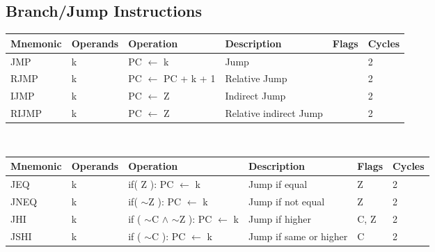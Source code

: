 \begin{footnotesize}
\subsection{Branch/Jump Instructions}
\begin{tabular}{|p{14.5mm}|p{14mm}|p{47mm}|p{46.5mm}|p{14mm}|p{10mm}|}
    \rowcolor{gray!50}
    Mnemonic & Operands  & Operation                                                              & Description & Flags & Cycles \\ \hline
    JMP      & k         & PC $\leftarrow$ k                                                      & Jump                                      &                & 2      \\
    RJMP     & k         & PC $\leftarrow$ PC + k + 1                                             & Relative Jump                             &                & 2      \\
    IJMP     & k         & PC $\leftarrow$ Z                                                      & Indirect Jump                             &                & 2      \\
    RIJMP    & k         & PC $\leftarrow$ Z                                                      & Relative indirect Jump                    &                & 2      \\
    \hline
\end{tabular}
\newline\\
\begin{tabular}{|p{14.5mm}|p{14mm}|p{47mm}|p{46.5mm}|p{14mm}|p{10mm}|}
    \rowcolor{gray!50}
    \hline
    Mnemonic & Operands  & Operation                                                              & Description & Flags & Cycles \\ \hline
    JEQ      & k         & if( Z ): PC $\leftarrow$ k                                             & Jump if equal                             & Z              & 2      \\
    JNEQ     & k         & if( $\sim$Z ): PC $\leftarrow$ k                                       & Jump if not equal                         & Z              & 2      \\
    JHI      & k         & if ( $\sim$C $\land$ $\sim$Z ): PC $\leftarrow$ k                            & Jump if higher                            & C, Z           & 2      \\
    JSHI     & k         & if ( $\sim$C ): PC $\leftarrow$ k                                      & Jump if same or higher                    & C              & 2      \\

\end{tabular}
\end{footnotesize}
